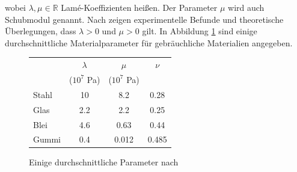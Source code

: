 \documentclass{scrartcl}
\def\R{\mathbb{R}}
\begin{document}
wobei $\lambda,\mu\in\R$ Lamé-Koeffizienten heißen. Der Parameter $\mu$ wird auch Schubmodul genannt. Nach \cite[S.11,S.14]{Lif-1959} zeigen experimentelle Befunde und theoretische Überlegungen, dass $\lambda>0$ und $\mu>0$ gilt. In Abbildung \ref{ta:durchschnittlicheParameter} sind einige durchschnittliche Materialparameter für gebräuchliche Materialien angegeben.
\begin{figure}[h]
\centering
\begin{tabular}{lccc}
	\toprule
	& $\lambda$ & $\mu$ & $\nu$ \\
	& ($10^7$ Pa) & ($10^7$ Pa) & \\
	\midrule
	Stahl &	10 & 8.2 & 0.28 \\
	Glas & 2.2 & 2.2 & 0.25 \\
	Blei & 4.6 & 0.63 & 0.44 \\
	Gummi & 0.4 &0.012 & 0.485 \\
	\bottomrule
\end{tabular}
\caption{Einige durchschnittliche Parameter nach \cite[S.129]{Cia-1988}}
\label{ta:durchschnittlicheParameter}
\end{figure}%
\end{document}
